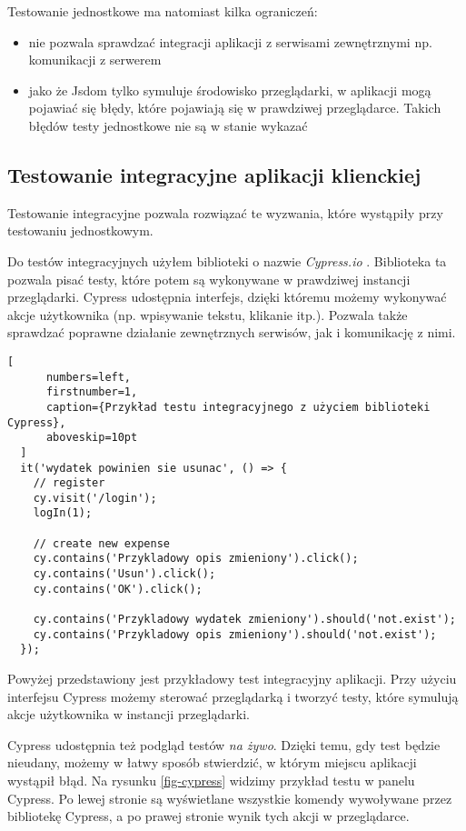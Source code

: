 Testowanie jednostkowe ma natomiast kilka ograniczeń:
\begin{itemize}
  \item nie pozwala sprawdzać integracji aplikacji z serwisami zewnętrznymi np. komunikacji z serwerem
  \item jako że Jsdom tylko symuluje środowisko przeglądarki, w aplikacji mogą pojawiać się błędy, które pojawiają się w prawdziwej przeglądarce. Takich błędów testy jednostkowe nie są w stanie wykazać
\end{itemize}

\subsection{Testowanie integracyjne aplikacji klienckiej}
Testowanie integracyjne pozwala rozwiązać te wyzwania, które wystąpiły przy testowaniu jednostkowym.

Do testów integracyjnych użyłem biblioteki o nazwie \emph{Cypress.io} \cite{ref_cypress_doc}. Biblioteka ta pozwala pisać testy, które potem są wykonywane w prawdziwej instancji przeglądarki. Cypress udostępnia interfejs, dzięki któremu możemy wykonywać akcje użytkownika (np. wpisywanie tekstu, klikanie itp.). Pozwala także sprawdzać poprawne działanie zewnętrznych serwisów, jak i komunikację z nimi.

  \begin{addmargin}[6mm]{0mm}
  \begin{lstlisting}[
      numbers=left,
      firstnumber=1,
      caption={Przykład testu integracyjnego z użyciem biblioteki Cypress},
      aboveskip=10pt
  ]
  it('wydatek powinien sie usunac', () => {
    // register
    cy.visit('/login');
    logIn(1);

    // create new expense
    cy.contains('Przykladowy opis zmieniony').click();
    cy.contains('Usun').click();
    cy.contains('OK').click();

    cy.contains('Przykladowy wydatek zmieniony').should('not.exist');
    cy.contains('Przykladowy opis zmieniony').should('not.exist');
  });
  \end{lstlisting}
  \end{addmargin}
  Powyżej przedstawiony jest przykładowy test integracyjny aplikacji. Przy użyciu interfejsu Cypress możemy sterować przeglądarką i tworzyć testy, które symulują akcje użytkownika w instancji przeglądarki.

Cypress udostępnia też podgląd testów \emph{na żywo}. Dzięki temu, gdy test będzie nieudany, możemy w łatwy sposób stwierdzić, w którym miejscu aplikacji wystąpił błąd. Na rysunku \ref{fig-cypress} widzimy przykład testu w panelu Cypress. Po lewej stronie są wyświetlane wszystkie komendy wywoływane przez bibliotekę Cypress, a po prawej stronie wynik tych akcji w przeglądarce.

